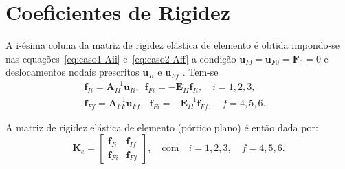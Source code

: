 \section{Coeficientes de Rigidez}
A i-ésima coluna da matriz de rigidez elástica de elemento é obtida impondo-se nas equações~\ref{eq:caso1-Aii} e~\ref{eq:caso2-Aff} a condição $\mathbf{u}_{I0} = \mathbf{u}_{F0}= \mathbf{F}_0 = 0$ e deslocamentos nodais prescritos $\mathbf{u}_{Ii} \,\,\textrm{e}\,\, \mathbf{u}_{Ff}$ . Tem-se
\begin{align}
	\mathbf{f}_{Ii} = \mathbf{A}^{-1}_{II} \mathbf{u}_{Ii},\,\,\, \mathbf{f}_{Fi} = -\mathbf{E}_{II} \mathbf{f}_{Ii}, \quad i=1,2,3, & \\
	\mathbf{f}_{Ff} = \mathbf{A}^{-1}_{FF} \mathbf{u}_{Ff},\,\,\, \mathbf{f}_{Fi} = -\mathbf{E}_{II}^{-1} \mathbf{f}_{Ff}, \quad f=4,5,6.
\end{align}

A matriz de rigidez elástica de elemento (pórtico plano) é então dada por:
\begin{equation}
	\mathbf{K}_e
	=
	\begin{bmatrix}
		\mathbf{f}_{Ii} & \mathbf{f}_{If} \\
		\mathbf{f}_{Fi} & \mathbf{f}_{Ff}
	\end{bmatrix},
	\quad \textrm{com} \quad
	i=1,2,3, \quad
	f=4,5,6.
\end{equation}